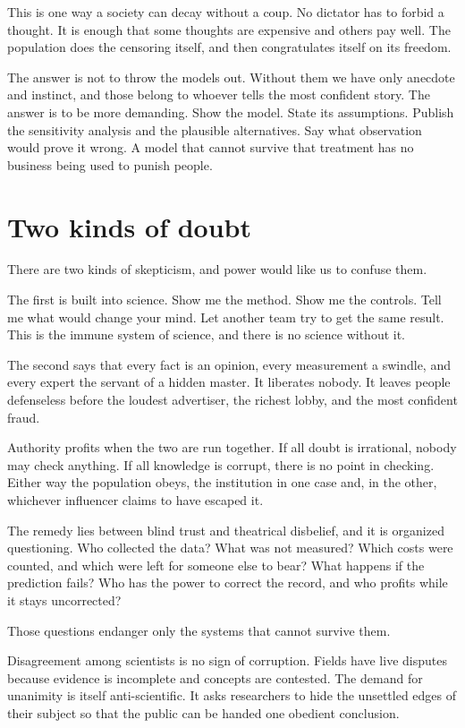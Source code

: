 \documentclass[12pt,a4paper]{book}
\begin{document}
This is one way a society can decay without a coup. No dictator has to forbid a thought. It is enough that some thoughts are expensive and others pay well. The population does the censoring itself, and then congratulates itself on its freedom.

The answer is not to throw the models out. Without them we have only anecdote and instinct, and those belong to whoever tells the most confident story. The answer is to be more demanding. Show the model. State its assumptions. Publish the sensitivity analysis and the plausible alternatives. Say what observation would prove it wrong. A model that cannot survive that treatment has no business being used to punish people.

\section{Two kinds of doubt}

There are two kinds of skepticism, and power would like us to confuse them.

The first is built into science. Show me the method. Show me the controls. Tell me what would change your mind. Let another team try to get the same result. This is the immune system of science, and there is no science without it.

The second says that every fact is an opinion, every measurement a swindle, and every expert the servant of a hidden master. It liberates nobody. It leaves people defenseless before the loudest advertiser, the richest lobby, and the most confident fraud.

Authority profits when the two are run together. If all doubt is irrational, nobody may check anything. If all knowledge is corrupt, there is no point in checking. Either way the population obeys, the institution in one case and, in the other, whichever influencer claims to have escaped it.

The remedy lies between blind trust and theatrical disbelief, and it is organized questioning. Who collected the data? What was not measured? Which costs were counted, and which were left for someone else to bear? What happens if the prediction fails? Who has the power to correct the record, and who profits while it stays uncorrected?

Those questions endanger only the systems that cannot survive them.

Disagreement among scientists is no sign of corruption. Fields have live disputes because evidence is incomplete and concepts are contested. The demand for unanimity is itself anti-scientific. It asks researchers to hide the unsettled edges of their subject so that the public can be handed one obedient conclusion.
\end{document}
